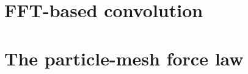 \documentclass[11 pt]{article}
\begin{document}
    \section{FFT-based convolution}
        

    \clearpage
    \section{The particle-mesh force law}
        
\end{document}

